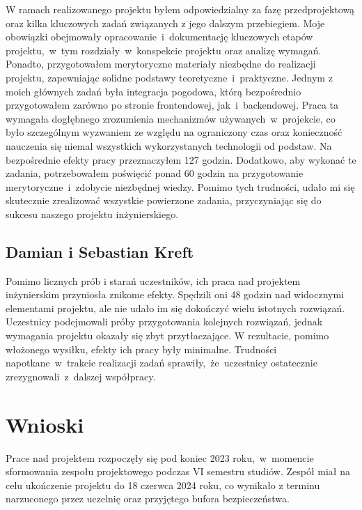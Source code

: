 W ramach realizowanego projektu byłem odpowiedzialny za fazę przedprojektową oraz kilka kluczowych zadań związanych z jego dalszym przebiegiem.\newline
Moje obowiązki obejmowały opracowanie~i~dokumentację kluczowych etapów projektu,~w~tym rozdziały~w~konspekcie projektu oraz analizę wymagań. \newline
Ponadto, przygotowałem merytoryczne materiały niezbędne do realizacji projektu, zapewniając solidne podstawy teoretyczne~i~praktyczne. \newline
Jednym z moich głównych zadań była integracja pogodowa, którą bezpośrednio przygotowałem zarówno po stronie frontendowej, jak~i~backendowej.\newline
\indent Praca ta wymagała dogłębnego zrozumienia mechanizmów używanych~w~projekcie, co było szczególnym wyzwaniem ze względu na ograniczony czas oraz konieczność nauczenia się niemal wszystkich wykorzystanych technologii od podstaw.
Na bezpośrednie efekty pracy przeznaczyłem 127 godzin. Dodatkowo, aby wykonać te zadania, potrzebowałem poświęcić ponad 60 godzin na przygotowanie merytoryczne~i~zdobycie niezbędnej wiedzy.\newline
Pomimo tych trudności, udało mi się skutecznie zrealizować wszystkie powierzone zadania, przyczyniając się do sukcesu naszego projektu inżynierskiego.

\subsection{Damian i Sebastian Kreft}
\label{subsec:bracia-kreft}
Pomimo licznych prób i starań uczestników, ich praca nad projektem inżynierskim przyniosła znikome efekty. 
Spędzili oni 48 godzin nad widocznymi elementami projektu, ale nie udało im się dokończyć wielu istotnych rozwiązań.
Uczestnicy podejmowali próby przygotowania kolejnych rozwiązań, jednak wymagania projektu okazały się zbyt przytłaczające. 
W rezultacie, pomimo włożonego wysiłku, efekty ich pracy były minimalne. Trudności napotkane~w~trakcie realizacji zadań sprawiły,~że~uczestnicy ostatecznie zrezygnowali~z~dalszej współpracy.



\section{Wnioski}\label{sec:wnioski}
Prace nad projektem rozpoczęły się pod koniec 2023 roku,~w~momencie sformowania zespołu projektowego podczas VI semestru studiów.
Zespół miał na celu ukończenie projektu do 18 czerwca 2024 roku, co wynikało z terminu narzuconego przez uczelnię oraz przyjętego bufora bezpieczeństwa.

